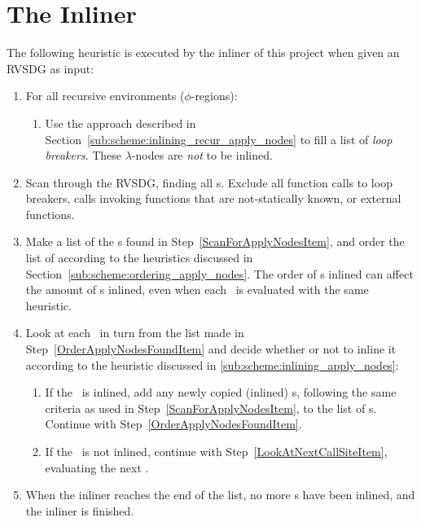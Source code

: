 
\clearpage
\section{The Inliner}
\label{scheme:start}


The following heuristic is executed by the inliner of this project when given an
RVSDG as input:

\begin{enumerate}
	\item For all recursive environments ($\phi$-regions):

	\begin{enumerate}
		\item Use the approach described in
Section~\ref{sub:scheme:inlining_recur_apply_nodes} to fill a list of
\textit{loop breakers}. These $\lambda$-nodes are \textit{not} to be inlined.
		\label{MakeLoopBreakerListItem}
	\end{enumerate}

	\item Scan through the RVSDG, finding all \applyNode s. Exclude all function
calls to loop breakers, calls invoking functions that are not-statically known,
or external functions.
	\label{ScanForApplyNodesItem}

	\item Make a list of the \applyNode s found in
Step~\ref{ScanForApplyNodesItem}, and order the list of according to the
heuristics discussed in Section~\ref{sub:scheme:ordering_apply_nodes}.
The order of \applyNode s inlined can affect the amount of \applyNode s inlined,
even when each \applyNode~is evaluated with the same heuristic.
	\label{OrderApplyNodesFoundItem}

	\item Look at each \applyNode~in turn from the list made in
Step~\ref{OrderApplyNodesFoundItem} and decide whether or not to inline it
according to the heuristic discussed in \ref{sub:scheme:inlining_apply_nodes}:
	\label{LookAtNextCallSiteItem}

	\begin{enumerate}
		\item If the \applyNode~is inlined, add any newly copied (inlined)
\applyNode s, following the same criteria as used in
Step~\ref{ScanForApplyNodesItem}, to the list of \applyNode s. Continue with
Step~\ref{OrderApplyNodesFoundItem}.

		\item If the \applyNode~is not inlined, continue with
Step~\ref{LookAtNextCallSiteItem}, evaluating the next \applyNode .
		\label{InlineCallSiteItem}
	\end{enumerate}

	\item When the inliner reaches the end of the list, no more \applyNode s
have been inlined, and the inliner is finished.
\end{enumerate}

